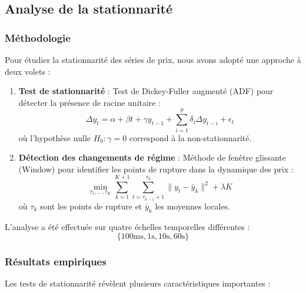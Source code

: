 \documentclass[12pt,a4paper]{article}
\theoremstyle{definition}
\theoremstyle{remark}
\begin{document}
\subsection{Analyse de la stationnarité}

\subsubsection{Méthodologie}

Pour étudier la stationnarité des séries de prix, nous avons adopté une approche à deux volets :

\begin{enumerate}
    \item \textbf{Test de stationnarité} : Test de Dickey-Fuller augmenté (ADF) pour détecter la présence de racine unitaire :
    \[\Delta y_t = \alpha + \beta t + \gamma y_{t-1} + \sum_{i=1}^p \delta_i \Delta y_{t-i} + \epsilon_t\]
    où l'hypothèse nulle $H_0: \gamma = 0$ correspond à la non-stationnarité.
    
    \item \textbf{Détection des changements de régime} : Méthode de fenêtre glissante (Window) pour identifier les points de rupture dans la dynamique des prix :
    \[
    \min_{\tau_1,\ldots,\tau_K} \sum_{k=1}^{K+1} \sum_{t=\tau_{k-1}+1}^{\tau_k} \|y_t - \bar{y}_k\|^2 + \lambda K
    \]
    où $\tau_k$ sont les points de rupture et $\bar{y}_k$ les moyennes locales.
\end{enumerate}

L'analyse a été effectuée sur quatre échelles temporelles différentes :
\[\{\text{100ms}, \text{1s}, \text{10s}, \text{60s}\}\]

\subsubsection{Résultats empiriques}

Les tests de stationnarité révèlent plusieurs caractéristiques importantes :
\end{document}
